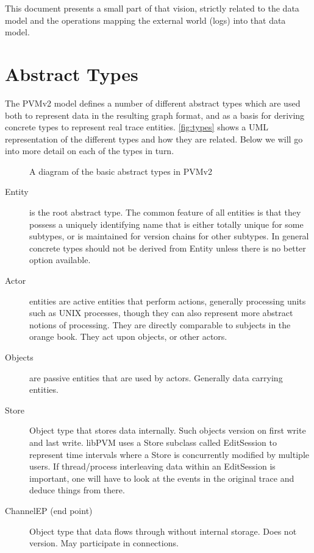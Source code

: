 \documentclass[12pt,twoside,a4paper]{article}
\begin{document}
This document presents a small part of that vision, strictly related to the data model and the operations mapping the external world (logs) into that data model. 

\section{Abstract Types}
\label{sec:ty}
The PVMv2 model defines a number of different abstract types which are used both to represent data in the resulting graph format, and as a basis for deriving concrete types to represent real trace entities. 
\autoref{fig:types} shows a UML representation of the different types and how they are related. Below we will go into more detail on each of the types in turn.

\begin{figure}[h]
\centering

\caption{A diagram of the basic abstract types in PVMv2}
\label{fig:types}
\end{figure}

\begin{description}
\item[Entity]
\label{sec:ty:entity}
 is the root abstract type. The common feature of all entities is that they possess a uniquely identifying name that is either totally unique for some subtypes, or is maintained for version chains for other subtypes. 
 In general concrete types should not be derived from Entity unless there is no better option available.

\item[Actor]
\label{sec:ty:actor}
 entities are active entities that perform actions, generally processing units such as UNIX processes, though they can also represent more abstract notions of processing. 
 They are directly comparable to subjects in the orange book. They act upon objects, or other actors.

\item[Objects]
\label{sec:ty:object}
are passive entities that are used by actors. Generally data carrying entities.

\item[Store]
\label{sec:ty:store}
Object type that stores data internally. 
Such objects version on first write and last write. libPVM uses a Store subclass called EditSession to represent time intervals where a Store is concurrently modified by multiple users. If thread/process interleaving data within an EditSession is important, one will have to look at the  events in the original trace and deduce things from there.

\item[ChannelEP (end point)]
\label{sec:ty:chanep}
Object type that data flows through without internal storage. Does not version. May participate in connections.
\end{description}
\end{document}
